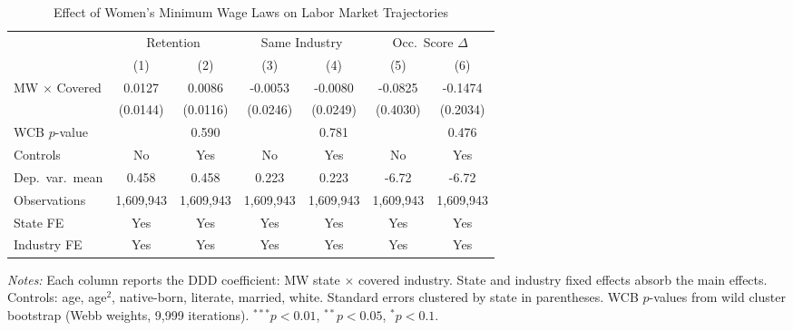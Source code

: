 \begin{table}[t]
\centering
\caption{Effect of Women's Minimum Wage Laws on Labor Market Trajectories}
\label{tab:main}
\begin{tabular}{lcccccc}
\toprule
 & \multicolumn{2}{c}{Retention} & \multicolumn{2}{c}{Same Industry} & \multicolumn{2}{c}{Occ.\ Score $\Delta$} \\
\cmidrule(lr){2-3} \cmidrule(lr){4-5} \cmidrule(lr){6-7}
 & (1) & (2) & (3) & (4) & (5) & (6) \\
\midrule
MW $\times$ Covered & 0.0127 & 0.0086 & -0.0053 & -0.0080 & -0.0825 & -0.1474 \\
 & (0.0144) & (0.0116) & (0.0246) & (0.0249) & (0.4030) & (0.2034) \\
WCB $p$-value & & 0.590 & & 0.781 & & 0.476 \\
\midrule
Controls & No & Yes & No & Yes & No & Yes \\
Dep.\ var.\ mean & 0.458 & 0.458 & 0.223 & 0.223 & -6.72 & -6.72 \\
Observations & 1,609,943 & 1,609,943 & 1,609,943 & 1,609,943 & 1,609,943 & 1,609,943 \\
State FE & Yes & Yes & Yes & Yes & Yes & Yes \\
Industry FE & Yes & Yes & Yes & Yes & Yes & Yes \\
\bottomrule
\end{tabular}
\begin{tablenotes}
\small
\item \textit{Notes:} Each column reports the DDD coefficient: MW state $\times$ covered industry.
State and industry fixed effects absorb the main effects. Controls: age, age$^2$, native-born,
literate, married, white. Standard errors clustered by state in parentheses.
WCB $p$-values from wild cluster bootstrap (Webb weights, 9,999 iterations).
$^{***}p<0.01$, $^{**}p<0.05$, $^{*}p<0.1$.
\end{tablenotes}
\end{table}
